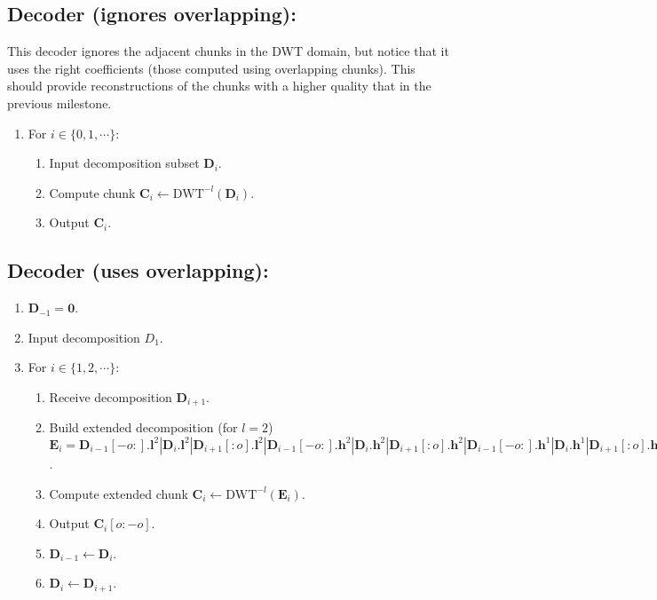 \subsection*{Decoder (ignores overlapping):}
This decoder ignores the adjacent chunks in the DWT domain, but notice that it uses the right coefficients (those computed using overlapping chunks). This should provide reconstructions of the chunks with a higher quality that in the previous milestone.
\begin{enumerate}
\item For $i\in\{0,1,\cdots\}$:
  \begin{enumerate}
  \item Input decomposition subset ${\mathbf D}_i$.
  \item Compute chunk ${\mathbf C}_i\leftarrow\text{DWT}^{-l}({\mathbf D}_i)$.
  \item Output ${\mathbf C}_i$.
  \end{enumerate}
\end{enumerate}

\subsection*{Decoder (uses overlapping):}

\begin{enumerate}
\item ${\mathbf D}_{-1}={\mathbf 0}$.
\item Input decomposition $D_1$.
\item For $i\in\{1,2,\cdots\}$:
  \begin{enumerate}
  \item Receive decomposition ${\mathbf D}_{i+1}$.
  \item Build extended decomposition (for $l=2$) ${\mathbf E}_i =
    {\mathbf D}_{i-1}[-o:].{\mathbf l}^2|{\mathbf D}_i.{\mathbf l}^2|{\mathbf D}_{i+1}[:o].{\mathbf l}^2|{\mathbf D}_{i-1}[-o:].{\mathbf h}^2|{\mathbf D}_i.{\mathbf h}^2|{\mathbf D}_{i+1}[:o].{\mathbf h}^2|{\mathbf D}_{i-1}[-o:].{\mathbf h}^1|{\mathbf D}_i.{\mathbf h}^1|{\mathbf D}_{i+1}[:o].{\mathbf h}^1$.
  \item Compute extended chunk ${\mathbf C}_i\leftarrow\text{DWT}^{-l}({\mathbf E}_i)$.
  \item Output ${\mathbf C}_i[o:-o]$.
  \item ${\mathbf D}_{i-1} \leftarrow {\mathbf D}_i$.
  \item ${\mathbf D}_i \leftarrow {\mathbf D}_{i+1}$.
  \end{enumerate}
\end{enumerate}


